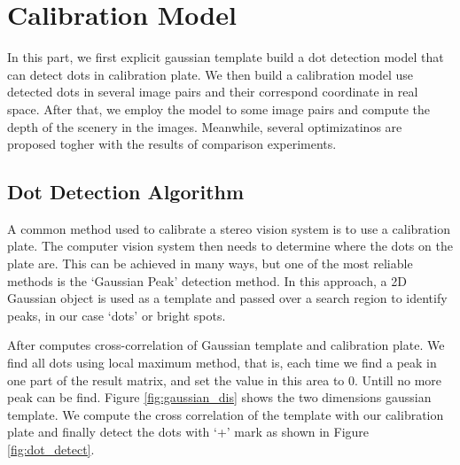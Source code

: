 \chapter{Calibration Model}

In this part, we first explicit gaussian template build a dot detection model that can detect dots in calibration plate. We then build a calibration model use detected dots in several image pairs and their correspond coordinate in real space. After that, we employ the model to some image pairs and compute the depth of the scenery in the images. Meanwhile, several optimizatinos are proposed togher with the results of comparison experiments.

\section{Dot Detection Algorithm}

A common method used to calibrate a stereo vision system is to use a calibration plate. The computer vision system then needs to determine where the dots on the plate are. This can be achieved in many ways, but one of the most reliable methods is the ‘Gaussian Peak’ detection method. In this approach, a 2D Gaussian object is used as a template and passed over a search region to identify peaks, in our case ‘dots’ or bright spots. 

After computes cross-correlation of Gaussian template and calibration plate. We find all dots using local maximum method, that is, each time we find a peak in one part of the result matrix, and set the value in this area to 0. Untill no more peak can be find. Figure \ref{fig:gaussian_dis} shows the two dimensions gaussian template. We compute the cross correlation of the template with our calibration plate and finally detect the dots with `+' mark as shown in Figure \ref{fig:dot_detect}.

